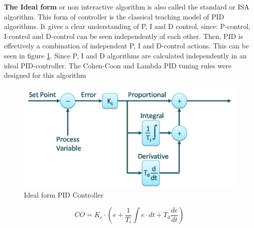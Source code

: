 
\textbf{The Ideal form} or non interactive algorithm is also called the standard or ISA algorithm. This form of controller is the classical teaching model of PID algorithms. It gives a clear understanding of P, I and D control, since: P-control, I-control and D-control can be seen independently of each other. Then, PID is effectively a combination of independent P, I and D-control actions. This can be seen in figure \ref{figure: Ideal PID}.
Since P, I and D algorithms are calculated independently in an ideal PID-controller. The Cohen-Coon and Lambda PID tuning rules were designed for this algorithm

\begin{figure}[H]
	\centering
	\includegraphics[width=0.8\columnwidth]{Pictures/ideal.png}
	\caption[Short title]{Ideal form PID Controller \cite{PID}}
	\label{figure: Ideal PID}
\end{figure}

\begin{equation}
\label{eqn:2}
    CO = K_c\cdot\left(e + \frac{1}{T_i}\int e\cdot dt +T_d\frac{de}{dt} \right)
\end{equation}


